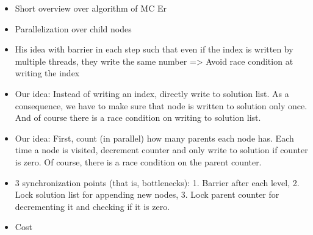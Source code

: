 \begin{invisible}
 \begin{itemize}
  \item Short overview over algorithm of MC Er
  \item Parallelization over child nodes
  \item His idea with barrier in each step such that even if the index is written by multiple threads, they write the same number => Avoid race condition at writing the index
  \item Our idea: Instead of writing an index, directly write to solution list. As a consequence, we have to make sure that node is written to solution only once. And of course there is a race condition on writing to solution list.
  \item Our idea: First, count (in parallel) how many parents each node has. Each time a node is visited, decrement counter and only write to solution if counter is zero. Of course, there is a race condition on the parent counter.
  \item 3 synchronization points (that is, bottlenecks): 1. Barrier after each level, 2. Lock solution list for appending new nodes, 3. Lock parent counter for decrementing it and checking if it is zero.
  \item Cost
 \end{itemize}

 
\end{invisible}